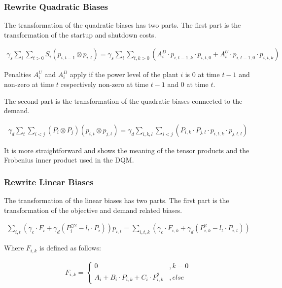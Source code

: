 \subsubsection{Rewrite Quadratic Biases}

The transformation of the quadratic biases has two parts.
The first part is the transformation of the startup and shutdown costs.

\begin{align}
  \gamma_s \sum_i \sum_{t > 0} S_i \left( p_{i, t-1} \otimes p_{i, t} \right)
  = \gamma_s \sum_i \sum_{t, k > 0} \left(
    A_i^D \cdot p_{i, t-1, k} \cdot p_{i, t, 0}
    + A_i^U \cdot p_{i, t-1, 0} \cdot p_{i, t, k}
  \right)
\end{align}

Penalties $A_i^U$ and $A_i^D$ apply if the power level of the plant $i$ is $0$ at time $t-1$ and non-zero at time $t$ respectively non-zero at time $t-1$ and $0$ at time $t$.

The second part is the transformation of the quadratic biases connected to the demand.

\begin{align}
  \gamma_d \sum_t \sum_{i < j} \left( P_i \otimes P_j \right) \left( p_{i, t} \otimes p_{j, t} \right)
  = \gamma_d \sum_{i, k, l} \sum_{i < j} \left( P_{i,k} \cdot P_{j,l} \cdot p_{i, t, k} \cdot p_{j, t, l} \right)
\end{align}

It is more straightforward and shows the meaning of the tensor products and the Frobenius inner product used in the DQM.

\subsubsection{Rewrite Linear Biases}

The transformation of the linear biases has two parts.
The first part is the transformation of the objective and demand related biases.

\begin{align}
  \sum_{i, t} \left(
    \gamma_c \cdot F_i + \gamma_d \left( P_i^{\odot 2} - l_t \cdot P_i \right)
  \right) p_{i, t}
  =
  \sum_{i, t, k} \left(
    \gamma_c \cdot F_{i, k} + \gamma_d \left( P_{i, k}^2 - l_t \cdot P_{i, t} \right)
  \right)
\end{align}

Where $F_{i, k}$ is defined as follows:

\begin{align}
  F_{i, k} = \begin{cases}
    0 & , k = 0 \\
    A_i + B_i \cdot P_{i, k} + C_i \cdot P_{i, k}^2 & , else
  \end{cases}
\end{align}

